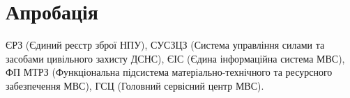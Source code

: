 \chapter{Апробація}

ЄРЗ (Єдиний реєстр зброї НПУ),
СУСЗЦЗ (Система управління силами та засобами цивільного захисту ДСНС),
ЄІС (Єдина інформаційна система МВС),
ФП МТРЗ (Функціональна підсистема матеріально-технічного та ресурсного забезпечення МВС),
ГСЦ (Головний сервісний центр МВС).

